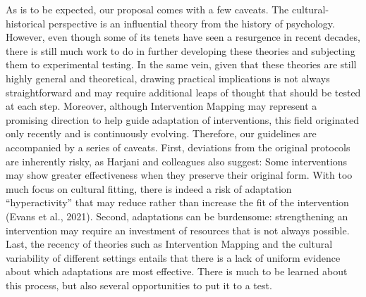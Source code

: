 \documentclass[authordate, empirical]{jote-new-article}
\begin{document}
	As is to be expected, our proposal comes with a few caveats. The cultural-historical perspective is an influential theory from the history of psychology. However, even though some of its tenets have seen a resurgence in recent decades, there is still much work to do in further developing these theories and subjecting them to experimental testing. In the same vein, given that these theories are still highly general and theoretical, drawing practical implications is not always straightforward and may require additional leaps of thought that should be tested at each step. Moreover, although Intervention Mapping may represent a promising direction to help guide adaptation of interventions, this field originated only recently and is continuously evolving. Therefore, our guidelines are accompanied by a series of caveats. First, deviations from the original protocols are inherently risky, as Harjani and colleagues also suggest: Some interventions may show greater effectiveness when they preserve their original form. With too much focus on cultural fitting, there is indeed a risk of adaptation “hyperactivity” that may reduce rather than increase the fit of the intervention (Evans et al., 2021). Second, adaptations can be burdensome: strengthening an intervention may require an investment of resources that is not always possible. Last, the recency of theories such as Intervention Mapping and the cultural variability of different settings entails that there is a lack of uniform evidence about which adaptations are most effective. There is much to be learned about this process, but also several opportunities to put it to a test.
\end{document}

